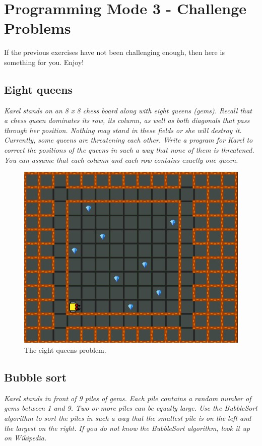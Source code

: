 \newpage

\section{Programming Mode 3 - Challenge Problems}

If the previous exercises have not been challenging enough, then here is something 
for you. Enjoy!

\subsection{Eight queens}

\noindent
{\em Karel stands on an 8 x 8 chess board along with eight queens (gems). Recall that a chess queen dominates its row, its column, as well as both diagonals that pass through her position. Nothing may stand in these fields or she will destroy it. Currently, some queens are threatening each other. Write a program for Karel to correct the positions of the queens in such a way that none of them is threatened. You can assume that each column and each row contains exactly one queen. }

\begin{figure}[!ht]
\begin{center}
\includegraphics[height=0.4\textwidth]{img/i04.png}
\end{center}
\vspace{-4mm}
\caption{The eight queens problem.}
\label{fig:g14}
\end{figure}

\newpage

\subsection{Bubble sort}

\noindent
{\em Karel stands in front of 9 piles of gems. Each pile contains a random number of gems between 1 and 9. Two or more piles can be equally large. Use the BubbleSort algorithm to sort the piles in such a way that the smallest pile is on the left and the largest on the right. If you do not know the BubbleSort algorithm, look it up on Wikipedia.}

